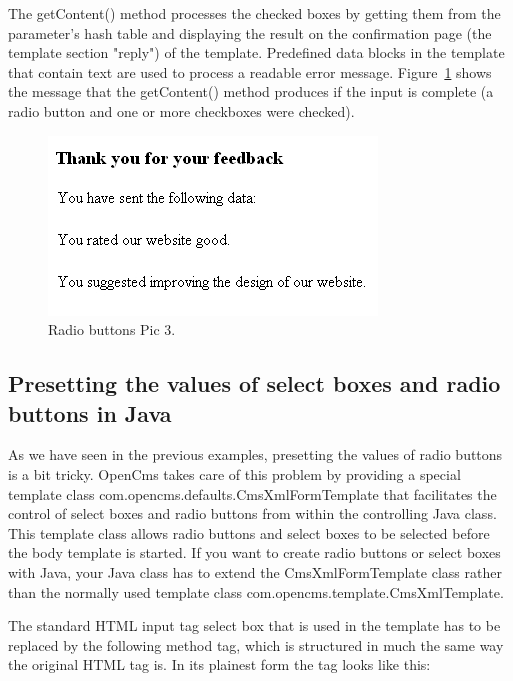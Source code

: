 The {\meth getContent()} method processes the checked boxes by getting them from
the parameter's hash table and displaying the result on the confirmation
page (the template section  {\name "reply")} of the template. Predefined data
blocks in the template that contain text are used to process a readable error message.
Figure~\ref{Feedback3} shows the message that the {\meth getContent()} method produces if the input
is complete (a radio button and one or more checkboxes were checked).

\begin{figure}
\begin{center}
\includegraphics[clip,width=0.6\linewidth]{pics/modules/46}
\end{center}
\caption[Radio buttons Pic 3]{Radio buttons Pic 3.}
\label{Feedback3}
\end{figure}


\subsection {Presetting the values of select boxes and radio buttons in Java}

As we have seen in the previous examples, presetting the values of radio
buttons is a bit tricky. OpenCms takes care of this problem by providing
a special template class {\class com.opencms.defaults.CmsXmlFormTemplate}
that facilitates the control of select boxes and radio buttons from within the controlling
Java class. This template class allows radio buttons and select boxes to
be selected before the body template is started. If you want to create
radio buttons or select boxes with Java, your Java class has to extend
the {\class CmsXmlFormTemplate} class rather than the normally used template class
{\class com.opencms.template.CmsXmlTemplate}.

The standard HTML input tag select box that is used in the template
has to be replaced by the following method tag, which is structured in
much the same way the original HTML tag is. In its plainest form the tag
looks like this:

